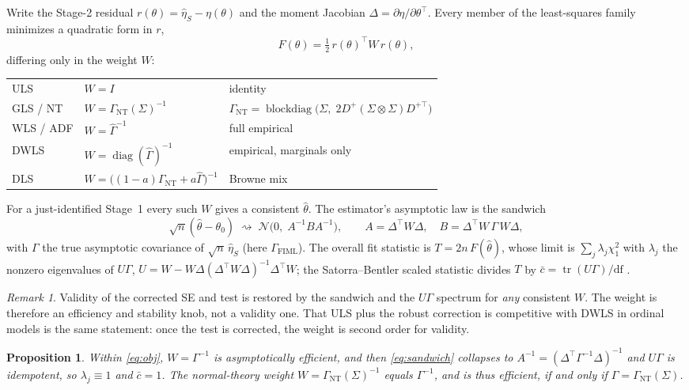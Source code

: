 \documentclass[11pt]{article}
\newcommand{\tr}{\operatorname{tr}}
\newcommand{\Gnt}{\Gamma_{\mathrm{NT}}}
\newcommand{\Gfiml}{\Gamma_{\mathrm{FIML}}}
\theoremstyle{plain}
\newtheorem{proposition}{Proposition}
\theoremstyle{remark}
\newtheorem*{remark}{Remark}
\begin{document}
Write the Stage-2 residual $r(\theta)=\hat\eta_S-\eta(\theta)$ and the moment
Jacobian $\Delta=\partial\eta/\partial\theta^\top$. Every member of the
least-squares family minimizes a quadratic form in $r$,
\begin{equation}\label{eq:obj}
  F(\theta)=\tfrac12\, r(\theta)^\top W\, r(\theta),
\end{equation}
differing only in the weight $W$:
\begin{center}
\begin{tabular}{lll}
ULS & $W=I$ & identity\\
GLS / NT & $W=\Gnt(\Sigma)^{-1}$ & $\Gnt=\operatorname{blockdiag}\!\big(\Sigma,\;2D^{+}(\Sigma\otimes\Sigma)D^{+\top}\big)$\\
WLS / ADF & $W=\hat\Gamma^{-1}$ & full empirical\\
DWLS & $W=\operatorname{diag}(\hat\Gamma)^{-1}$ & empirical, marginals only\\
DLS & $W=\big((1-a)\Gnt+a\hat\Gamma\big)^{-1}$ & Browne mix \cite{Browne1984}
\end{tabular}
\end{center}
For a just-identified Stage~1 every such $W$ gives a consistent $\hat\theta$.
The estimator's asymptotic law is the sandwich
\begin{equation}\label{eq:sandwich}
  \sqrt n(\hat\theta-\theta_0)\;\rightsquigarrow\;
  \mathcal N\!\big(0,\;A^{-1}BA^{-1}\big),\qquad
  A=\Delta^\top W\Delta,\quad B=\Delta^\top W\,\Gamma\,W\Delta,
\end{equation}
with $\Gamma$ the true asymptotic covariance of $\sqrt n\,\hat\eta_S$
(here $\Gfiml$). The overall fit statistic is $T=2n\,F(\hat\theta)$, whose limit
is $\sum_j\lambda_j\chi^2_{1}$ with $\lambda_j$ the nonzero eigenvalues of
$U\Gamma$, $U=W-W\Delta(\Delta^\top W\Delta)^{-1}\Delta^\top W$; the
Satorra--Bentler scaled statistic divides $T$ by $\bar c=\tr(U\Gamma)/\mathrm{df}$
\cite{SatorraBentler2001}.

\begin{remark}
Validity of the corrected SE and test is restored by the sandwich and the
$U\Gamma$ spectrum for \emph{any} consistent $W$. The weight is therefore an
efficiency and stability knob, not a validity one. That ULS plus the robust
correction is competitive with DWLS in ordinal models \cite{Forero2009,Li2016}
is the same statement: once the test is corrected, the weight is second order
for validity.
\end{remark}

\begin{proposition}\label{prop:opt}
Within \eqref{eq:obj}, $W=\Gamma^{-1}$ is asymptotically efficient, and then
\eqref{eq:sandwich} collapses to $A^{-1}=(\Delta^\top\Gamma^{-1}\Delta)^{-1}$
and $U\Gamma$ is idempotent, so $\lambda_j\equiv 1$ and $\bar c=1$. The
normal-theory weight $W=\Gnt(\Sigma)^{-1}$ equals $\Gamma^{-1}$, and is thus
efficient, if and only if $\Gamma=\Gnt(\Sigma)$.
\end{proposition}
\end{document}
